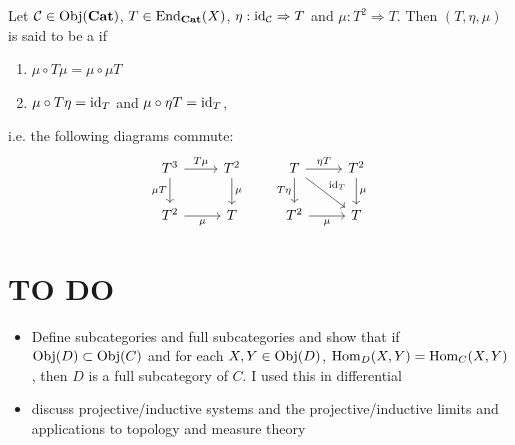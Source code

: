 \documentclass{book}
\begin{document}
	\begin{defn}
		Let $\mathcal{C} \in \operatorname{Obj}(\operatorname*{\text{\textbf{Cat}}})$, $T \in \operatorname{\text{End}}_{\operatorname*{\text{\textbf{Cat}}}}(X)$, $\eta: \operatorname{id}_{\mathcal{C}} \Rightarrow T$ and $\mu: T^2 \Rightarrow T$. Then $(T, \eta, \mu)$ is said to be a  if 
		\begin{enumerate}
			\item $\mu \circ T \mu = \mu \circ \mu T$
			\item $\mu \circ T \eta = \operatorname{id}_T$ and $\mu \circ \eta T = \operatorname{id}_T$,
		\end{enumerate}
		i.e. the following diagrams commute: 
		\[ 
		\begin{tikzcd}
			T^3  \arrow[r, "T \mu"]  \arrow[d, "\mu T"']  & T^2   \arrow[d, "\mu"]\\
			T^2 \arrow[r, "\mu"'] &  T 
		\end{tikzcd}
		\quad \quad 
		\begin{tikzcd}
			T  \arrow[r, "\eta T"]  \arrow[d, "T \eta"'] \arrow[dr, "\id_T"]  & T^2  \arrow[d, "\mu"]\\
			T^2 \arrow[r, "\mu"'] &  T 
		\end{tikzcd}
		\]
	\end{defn}
	
	
	
	
	
	
	
	
	
	
	
	
	
	
	
	
	
	
	
	
	
	
	
	
	
	
	
	
	
	
	
	
	
	
	
	
	
	
	
	
	
	
	
	
	
	
	
	
	
	
	
	
	
	
	

	\section{TO DO}
	\begin{itemize}
		\item Define subcategories and full subcategories and show that if $\operatorname{Obj}(D) \subset \operatorname{Obj}(C)$ and for each $X, Y \in \operatorname{Obj}(D)$, $\operatorname{Hom}_{D}(X, Y) = \operatorname{Hom}_{C}(X,Y)$, then $D$ is a full subcategory of $C$. I used this in differential 
		\item discuss projective/inductive systems and the projective/inductive limits and applications to topology and measure theory
	\end{itemize}
	
\end{document}
